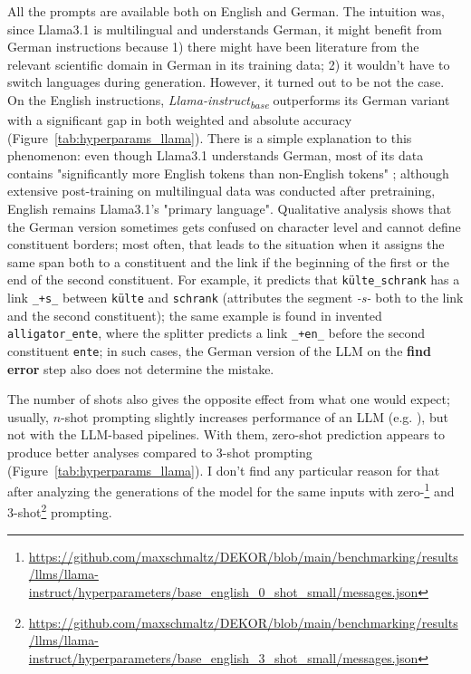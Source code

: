 \documentclass[11pt]{article}
\begin{document}
All the prompts are available both on English and German. The intuition was, since Llama3.1 is multilingual and understands German, it might benefit from German instructions because 1) there might have been literature from the relevant scientific domain in German in its training data; 2) it wouldn't have to switch languages during generation. However, it turned out to be not the case. On the English instructions, \textit{Llama-instruct\textsubscript{base}} outperforms its German variant with a significant gap in both weighted and absolute accuracy (Figure~\ref{tab:hyperparams_llama}). There is a simple explanation to this phenomenon: even though Llama3.1 understands German, most of its data contains "significantly more English tokens than non-English tokens" \cite{dubey2024llama3herdmodels}; although extensive post-training on multilingual data was conducted after pretraining, English remains Llama3.1's "primary language". Qualitative analysis shows that the German version sometimes gets confused on character level and cannot define constituent borders; most often, that leads to the situation when it assigns the same span both to a constituent and the link if the beginning of the first or the end of the second constituent. For example, it predicts that \texttt{k{\"u}lte\_schrank} has a link \texttt{\_+s\_} between \texttt{k{\"u}lte} and \texttt{schrank} (attributes the segment \textit{-s-} both to the link and the second constituent); the same example is found in invented \texttt{alligator\_ente}, where the splitter predicts a link \texttt{\_+en\_} before the second constituent \texttt{ente}; in such cases, the German version of the LLM on the \textbf{find error} step also does not determine the mistake.

The number of shots also gives the opposite effect from what one would expect; usually, $n$-shot prompting slightly increases performance of an LLM (e.g. \citealt{brown2020languagemodelsfewshotlearners}), but not with the LLM-based pipelines. With them, zero-shot prediction appears to produce better analyses compared to 3-shot prompting (Figure~\ref{tab:hyperparams_llama}). I don't find any particular reason for that after analyzing the generations of the model for the same inputs with zero-\footnote{\url{https://github.com/maxschmaltz/DEKOR/blob/main/benchmarking/results/llms/llama-instruct/hyperparameters/base_english_0_shot_small/messages.json}} and 3-shot\footnote{\url{https://github.com/maxschmaltz/DEKOR/blob/main/benchmarking/results/llms/llama-instruct/hyperparameters/base_english_3_shot_small/messages.json}} prompting.
\end{document}
